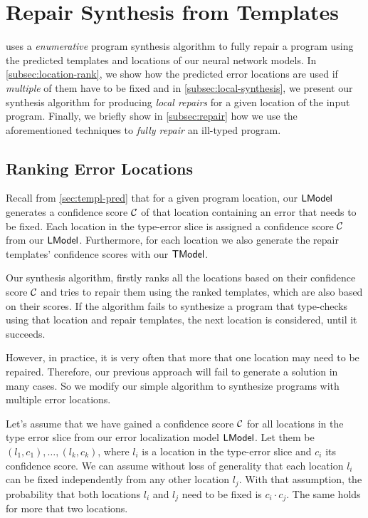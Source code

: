 \section{Repair Synthesis from Templates}
\label{sec:synthesis}
\toolname uses a \emph{enumerative} program synthesis algorithm to fully repair
a program using the predicted templates and locations of our neural network
models. In \autoref{subsec:location-rank}, we show how the predicted error
locations are used if \emph{multiple} of them have to be fixed and in
\autoref{subsec:local-synthesis}, we present our synthesis algorithm for
producing \emph{local repairs} for a given location of the input program.
Finally, we briefly show in \autoref{subsec:repair} how we use the
aforementioned techniques to \emph{fully repair} an ill-typed program.

\subsection{Ranking Error Locations}
\label{subsec:location-rank}

Recall from \autoref{sec:templ-pred} that for a given program location, our
$\mathsf{LModel}$ generates a confidence score $\mathcal{C}$ of that location containing an
error that needs to be fixed. Each location in the type-error slice is assigned
a confidence score $\mathcal{C}$ from our $\mathsf{LModel}$. Furthermore, for each location we
also generate the repair templates' confidence scores with our $\mathsf{TModel}$.

Our synthesis algorithm, firstly ranks all the locations based on their
confidence score $\mathcal{C}$ and tries to repair them using the ranked templates,
which are also based on their scores. If the algorithm fails to synthesize a
program that type-checks using that location and repair templates, the next
location is considered, until it succeeds.

However, in practice, it is very often that more that one location may need to
be repaired. Therefore, our previous approach will fail to generate a solution
in many cases. So we modify our simple algorithm to synthesize programs with
multiple error locations.

Let's assume that we have gained a confidence score $\mathcal{C}$ for all locations
in the type error slice from our error localization model $\mathsf{LModel}$. Let them be
$(l_1, c_1), \dots, (l_k, c_k)$, where $l_i$ is a location in the type-error
slice and $c_i$ its confidence score. We can assume without loss of generality
that each location $l_i$ can be fixed independently from any other location
$l_j$. With that assumption, the probability that both locations $l_i$ and $l_j$
need to be fixed is $c_i \cdot c_j$. The same holds for more that two locations.

